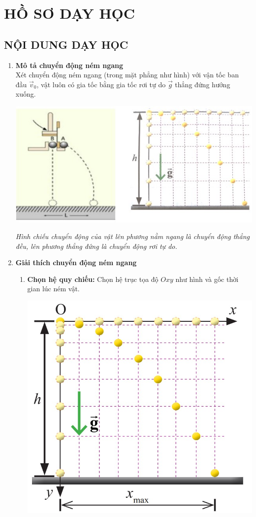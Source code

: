 \section{HỒ SƠ DẠY HỌC}
\subsection{NỘI DUNG DẠY HỌC}
\begin{enumerate}[label=\bfseries\Roman*.]
	\item \textbf{Mô tả chuyển động ném ngang}\\
	Xét chuyển động ném ngang (trong mặt phẳng như hình) với vận tốc ban đầu $\vec{v}_0$, vật luôn có gia tốc bằng gia tốc rơi tự do $\vec{g}$ thẳng đứng hướng xuống.
	\begin{center}
		\includegraphics[scale=0.7]{figs/G10-BAI12-3}
	\end{center}
	\textit{Hình chiếu chuyển động của vật lên phương nằm ngang là chuyển động thẳng đều, lên phương thẳng đứng là chuyển động rơi tự do.}
	\item \textbf{Giải thích chuyển động ném ngang}\\
	\begin{enumerate}[label=\bfseries \alph*.]
		\item \textbf{Chọn hệ quy chiếu:} Chọn hệ trục tọa độ $Oxy$ như hình và gốc thời gian lúc ném vật.
			\begin{center}
			\includegraphics[scale=0.6]{figs/G10-BAI12-2}

\end{center}
\end{enumerate}
\end{enumerate}
